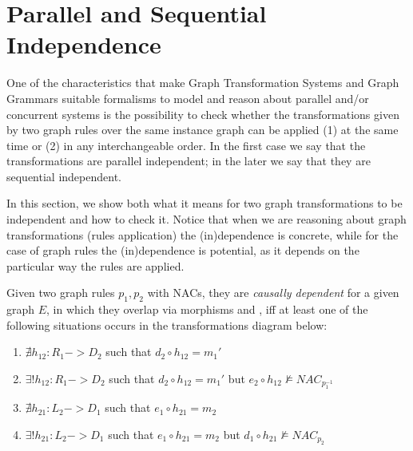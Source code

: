 \section{Parallel and Sequential Independence}

One of the characteristics that make Graph Transformation Systems and Graph Grammars suitable formalisms to model and reason about parallel and/or concurrent systems is the possibility to check whether the transformations given by two graph rules over the same instance graph can be applied (1) at the same time or (2) in any interchangeable order. In the first case we say that the transformations are parallel independent; in the later we say that they are sequential independent.

In this section, we show both what it means for two graph transformations to be independent and how to check it. Notice that when we are reasoning about graph transformations (rules application) the (in)dependence is concrete, while for the case of graph rules the (in)dependence is potential, as it depends on the particular way the rules are applied.

\begin{definition}\label{def:classic-dependency} Given two graph rules $p_1,p_2$ with NACs, they are \emph{causally dependent} for a given graph $E$, in which they overlap via morphisms  and , iff at least one of the following situations occurs in the transformations diagram below:

  \begin{enumerate}
    \item $\nexists h_{12} : R_1 -> D_2$ such that $d_2 \circ h_{12} = m_1'$
    \item $\exists! h_{12} : R_1 -> D_2$ such that $d_2 \circ h_{12} = m_1'$ but $e_2 \circ h_{12} \not\models NAC_{p_1^{-1}}$
    \item $\nexists h_{21} : L_2 -> D_1$ such that $e_1 \circ h_{21} = m_2$
    \item $\exists! h_{21} : L_2 -> D_1$ such that $e_1 \circ h_{21} = m_2$ but $d_1 \circ h_{21} \not\models NAC_{p_2}$
  \end{enumerate}

\end{definition}

